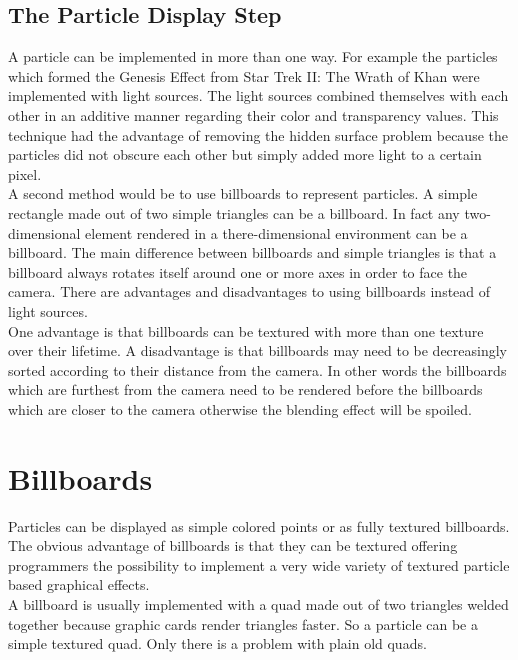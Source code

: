 \newpage
\subsection{The Particle Display Step}
A particle can be implemented in more than one way. For example the particles which formed the Genesis Effect from Star Trek II: The Wrath of Khan were implemented with light sources. The light sources combined themselves with each other in an additive manner regarding their color and transparency values. This technique had the advantage of removing the hidden surface problem because the particles did not obscure each other but simply added more light to a certain pixel.\\

A second method would be to use billboards to represent particles. A simple rectangle made out of two simple triangles can be a billboard. In fact any two-dimensional element rendered in a there-dimensional environment can be a billboard. The main difference between billboards and simple triangles is that a billboard always rotates itself around one or more axes in order to face the camera. There are advantages and disadvantages to using billboards instead of light sources.\\

One advantage is that billboards can be textured with more than one texture over their lifetime. A disadvantage is that billboards may need to be decreasingly sorted according to their distance from the camera. In other words the billboards which are furthest from the camera need to be rendered before the billboards which are closer to the camera otherwise the blending effect will be spoiled.\\

\newpage
\section{Billboards}
Particles can be displayed as simple colored points or as fully textured billboards. The obvious advantage of billboards is that they can be textured offering programmers the possibility to implement a very wide variety of textured particle based graphical effects.\\

A billboard is usually implemented with a quad made out of two triangles welded together because graphic cards render triangles faster. So a particle can be a simple textured quad. Only there is a problem with plain old quads.\\

